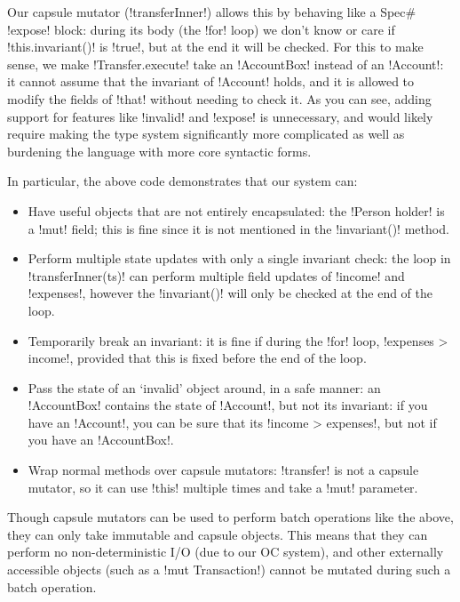 Our capsule mutator (\Q!transferInner!) allows this by behaving like a Spec\# \Q!expose! block: during its body (the \Q!for! loop) we don't know or care if \Q!this.invariant()! is \Q!true!, but at the end it will be checked. For this to make sense, we make \Q!Transfer.execute! take an \Q!AccountBox! instead of an \Q!Account!: it cannot assume that the invariant of \Q!Account! holds, and it is allowed to modify the fields of \Q!that! without needing to check it. As you can see, adding support for features like \Q!invalid! and \Q!expose! is unnecessary, and would likely require making the type system significantly more complicated as well as burdening the language with more core syntactic forms.

In particular, the above code demonstrates that our system can:
\SSI\begin{itemize}
\item Have useful objects that are not entirely encapsulated: the \Q!Person holder! is a \Q!mut! field; this is fine since it is not mentioned in the \Q!invariant()! method.
\item Perform multiple state updates with only a single invariant check: the loop in \Q!transferInner(ts)! can perform multiple field updates of \Q!income! and \Q!expenses!, however the \Q!invariant()! will only be checked at the end of the loop.
\item Temporarily break an invariant: it is fine if during the \Q!for! loop, \Q!expenses > income!, provided that this is fixed before the end of the loop.
\item Pass the state of an `invalid' object around, in a safe manner: an \Q!AccountBox! contains the state of \Q!Account!, but not its invariant: if you have an \Q!Account!, you can be sure that its \Q!income > expenses!, but not if you have an \Q!AccountBox!.
\item Wrap normal methods over capsule mutators: \Q!transfer! is not a capsule mutator, so it can use \Q!this! multiple times and take a \Q!mut! parameter.
\end{itemize}

\noindent Though capsule mutators can be used to perform batch operations like the above, they can only take immutable and capsule objects. This means that they can perform no non-deterministic I/O (due to our OC system), and other externally accessible objects (such as a \Q!mut Transaction!) cannot be mutated during such a batch operation.

